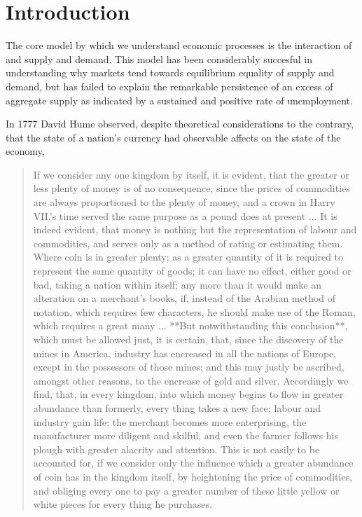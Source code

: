 
\section{Introduction}


The core model by which we understand economic processes is the interaction of and supply and
demand. This model has been considerably succesful in understanding why markets tend towards
equilibrium equality of supply and demand, but has failed to explain the remarkable persistence of
an excess of aggregate supply as indicated by a sustained and positive rate of unemployment.

In 1777 David Hume observed, despite theoretical considerations to the contrary, that the
state of a nation's currency had observable affects on the state of the economy,

\begin{quotation}
If we consider any one kingdom by itself, it is evident, that the greater or less plenty of money
is of no consequence; since the prices of commodities are always proportioned to the plenty of
money, and a crown in Harry VII.’s time served the same purpose as a pound does at present ... It is
indeed evident, that money is nothing but the representation of labour and commodities, and serves
only as a method of rating or estimating them. Where coin is in greater plenty; as a greater
quantity of it is required to represent the same quantity of goods; it can have no effect, either
good or bad, taking a nation within itself; any more than it would make an alteration on a
merchant’s books, if, instead of the Arabian method of notation, which requires few characters, he
should make use of the Roman, which requires a great many ... **But notwithstanding this
conclusion**, which must be allowed just, it is certain, that, since the discovery of the mines in
America, industry has encreased in all the nations of Europe, except in the possessors of those
mines; and this may justly be ascribed, amongst other reasons, to the encrease of gold and silver.
Accordingly we find, that, in every kingdom, into which money begins to flow in greater abundance
than formerly, every thing takes a new face: labour and industry gain life; the merchant becomes
more enterprising, the manufacturer more diligent and skilful, and even the farmer follows his
plough with greater alacrity and attention. This is not easily to be accounted for, if we consider
only the influence which a greater abundance of coin has in the kingdom itself, by heightening the
price of commodities, and obliging every one to pay a greater number of these little yellow or white
pieces for every thing he purchases.
\end{quotation}

